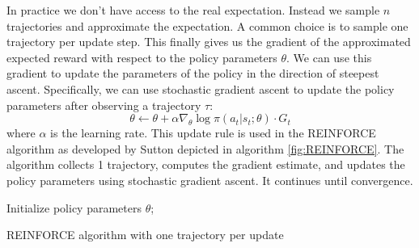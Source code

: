 In practice we don't have access to the real expectation. Instead we sample $n$ trajectories and approximate the expectation.
A common choice is to sample one trajectory per update step. 
This finally gives us the gradient of the approximated expected reward with respect to the policy parameters $\theta$. We can use this gradient to update the parameters of the policy in the direction of steepest ascent. Specifically, we can use stochastic gradient ascent to update the policy parameters after observing a trajectory $\tau$:
\begin{equation}
    \label{reinf_update}
    \theta \leftarrow \theta + \alpha \nabla_{\theta} \log \pi(a_t|s_t;\theta) \cdot G_t
\end{equation}
where $\alpha$ is the learning rate. This update rule is used in the REINFORCE algorithm as developed by Sutton \etAl \cite{NIPS1999_464d828b} depicted in algorithm \ref{fig:REINFORCE}.
The algorithm collects 1 trajectory, computes the gradient estimate, and updates the policy parameters using stochastic gradient ascent. 
It continues until convergence.

\begin{algorithm}[H]
    \SetAlgoLined
        Initialize policy parameters $\theta$;
    \caption{REINFORCE algorithm with one trajectory per update}
    \label{fig:REINFORCE}
\end{algorithm}
    

